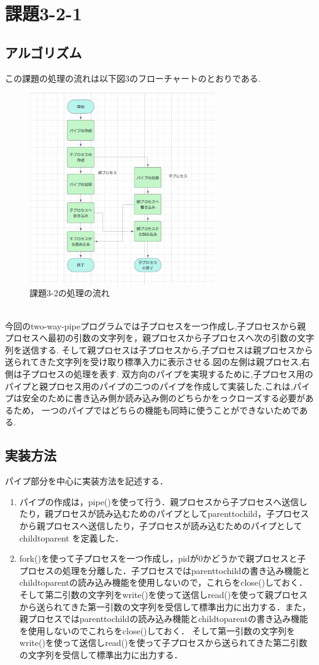 \documentclass[dvipdfmx]{jarticle}
\begin{document}
\section{課題3-2-1}
\subsection{アルゴリズム}
この課題の処理の流れは以下図3のフローチャートのとおりである.
\begin{figure}[h]
    \centering
    \includegraphics[width=8cm]{3-2hurotya.png}
    \caption{課題3-2の処理の流れ}
\end{figure}
\\
今回のtwo-way-pipeプログラムでは子プロセスを一つ作成し,子プロセスから親プロセスへ最初の引数の文字列を，親プロセスから子プロセスへ次の引数の文字列を送信する.
そして親プロセスは子プロセスから,子プロセスは親プロセスから送られてきた文字列を受け取り標準入力に表示させる.図の左側は親プロセス,右側は子プロセスの処理を表す.
双方向のパイプを実現するために,子プロセス用のパイプと親プロセス用のパイプの二つのパイプを作成して実装した.これは,パイプは安全のために書き込み側か読み込み側のどちらかをっクローズする必要があるため，
一つのパイプではどちらの機能も同時に使うことができないためである.
\subsection{実装方法}
パイプ部分を中心に実装方法を記述する．
\begin{enumerate}
    \item パイプの作成は，pipe()を使って行う．親プロセスから子プロセスへ送信したり，親プロセスが読み込むためのパイプとしてparenttochild，子プロセスから親プロセスへ送信したり，子プロセスが読み込むためのパイプとしてchildtoparent
    を定義した．
    \item fork()を使って子プロセスを一つ作成し，pidが0かどうかで親プロセスと子プロセスの処理を分離した．子プロセスではparenttochildの書き込み機能とchildtoparentの読み込み機能を使用しないので，これらをclose()しておく．
    そして第二引数の文字列をwrite()を使って送信しread()を使って親プロセスから送られてきた第一引数の文字列を受信して標準出力に出力する．また，親プロセスではparenttochildの読み込み機能とchildtoparentの書き込み機能を使用しないのでこれらをclose()しておく．
    そして第一引数の文字列をwrite()を使って送信しread()を使って子プロセスから送られてきた第二引数の文字列を受信して標準出力に出力する．
\end{enumerate}
\end{document}
